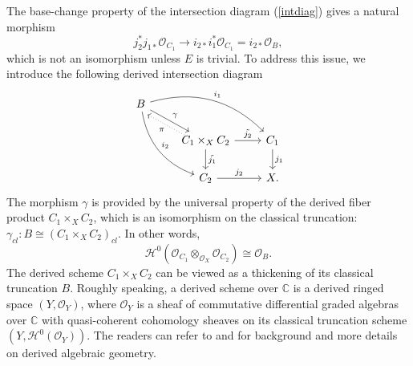 \documentclass[12pt]{amsart}
\theoremstyle{definition}
\theoremstyle{remark}
\numberwithin{equation}{section}
\newcommand{\CC}{\mathbb{C}}
\newcommand{\shH}{\mathcal{H}}
\newcommand{\shO}{\mathcal{O}}
\newcommand{\arw}{\longrightarrow}
\begin{document}
The base-change property of the intersection diagram (\ref{intdiag}) gives a natural morphism
$$ j_2^{*}j_{1*}\shO_{C_1}\arw i_{2*}i_1^{*}\shO_{C_1}=i_{2*}\shO_B,$$
which is not an isomorphism unless $E$ is trivial. 
To address this issue, we introduce the following derived intersection diagram
\begin{equation}\label{derintdiag}
   \begin{tikzcd}
    B
    \arrow[drr, bend left,"i_1"] \arrow[ddr, bend right, "i_2"] \arrow[dr, "\gamma"] &&\\
    & C_1\times_X C_2\arrow[r,"\tilde{j_2}"] \arrow[d,"\tilde{j_1}"]\arrow[ul, dotted, shift left=2, "\pi"]
& C_1 \arrow[d, "j_1"] \\
 & C_2 \arrow[r, "j_2"]
& X.
   \end{tikzcd}
  \end{equation}
The morphism $\gamma$ is provided by the universal property of the derived fiber product $C_1\times_X C_2$, which is an isomorphism on the classical truncation: $\gamma_{cl}: B\cong (C_1\times_X C_2)_{cl}$. In other words,
$$\shH^0(\shO_{C_1}\otimes_{\shO_X} \shO_{C_2})\cong \shO_B.$$
The derived scheme $C_1\times_X C_2$ can be viewed as a thickening of its classical truncation $B$. Roughly speaking, a derived scheme over $\CC$ is a derived ringed space $(Y, \shO_Y)$, where $\shO_Y$ is a sheaf of commutative differential graded algebras over $\CC$ with quasi-coherent cohomology sheaves on its classical truncation scheme $(Y, \shH^0(\shO_Y))$. The readers can refer to \cite{lurie2004derived} and \cite{toen2014derived} for background and more details on derived algebraic geometry.
\end{document}
